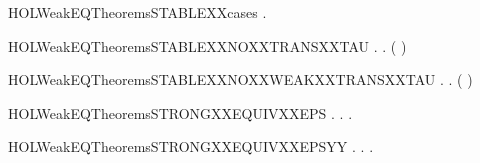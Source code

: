 \begin{SaveVerbatim}{HOLWeakEQTheoremsSTABLEXXcases}
\HOLTokenTurnstile{} \HOLSymConst{\HOLTokenForall{}}.   \HOLSymConst{\HOLTokenDisj{}} \HOLSymConst{\HOLTokenNeg{}} 
\end{SaveVerbatim}
\newcommand{\HOLWeakEQTheoremsSTABLEXXcases}{\UseVerbatim{HOLWeakEQTheoremsSTABLEXXcases}}
\begin{SaveVerbatim}{HOLWeakEQTheoremsSTABLEXXNOXXTRANSXXTAU}
\HOLTokenTurnstile{} \HOLSymConst{\HOLTokenForall{}}.   \HOLSymConst{\HOLTokenImp{}} \HOLSymConst{\HOLTokenForall{}}. \HOLSymConst{\HOLTokenNeg{}}( \HOLTokenTransBegin\HOLConst{\ensuremath{\tau}}\HOLTokenTransEnd {})
\end{SaveVerbatim}
\newcommand{\HOLWeakEQTheoremsSTABLEXXNOXXTRANSXXTAU}{\UseVerbatim{HOLWeakEQTheoremsSTABLEXXNOXXTRANSXXTAU}}
\begin{SaveVerbatim}{HOLWeakEQTheoremsSTABLEXXNOXXWEAKXXTRANSXXTAU}
\HOLTokenTurnstile{} \HOLSymConst{\HOLTokenForall{}}.   \HOLSymConst{\HOLTokenImp{}} \HOLSymConst{\HOLTokenForall{}}. \HOLSymConst{\HOLTokenNeg{}}( \HOLTokenWeakTransBegin\HOLConst{\ensuremath{\tau}}\HOLTokenWeakTransEnd {})
\end{SaveVerbatim}
\newcommand{\HOLWeakEQTheoremsSTABLEXXNOXXWEAKXXTRANSXXTAU}{\UseVerbatim{HOLWeakEQTheoremsSTABLEXXNOXXWEAKXXTRANSXXTAU}}
\begin{SaveVerbatim}{HOLWeakEQTheoremsSTRONGXXEQUIVXXEPS}
\HOLTokenTurnstile{} \HOLSymConst{\HOLTokenForall{}} .
          \HOLSymConst{\HOLTokenImp{}}
       \HOLSymConst{\HOLTokenForall{}}.    \HOLSymConst{\HOLTokenImp{}} \HOLSymConst{\HOLTokenExists{}}.    \HOLSymConst{\HOLTokenConj{}}   
\end{SaveVerbatim}
\newcommand{\HOLWeakEQTheoremsSTRONGXXEQUIVXXEPS}{\UseVerbatim{HOLWeakEQTheoremsSTRONGXXEQUIVXXEPS}}
\begin{SaveVerbatim}{HOLWeakEQTheoremsSTRONGXXEQUIVXXEPSYY}
\HOLTokenTurnstile{} \HOLSymConst{\HOLTokenForall{}} .
          \HOLSymConst{\HOLTokenImp{}}
       \HOLSymConst{\HOLTokenForall{}}.    \HOLSymConst{\HOLTokenImp{}} \HOLSymConst{\HOLTokenExists{}}.    \HOLSymConst{\HOLTokenConj{}}   
\end{SaveVerbatim}
